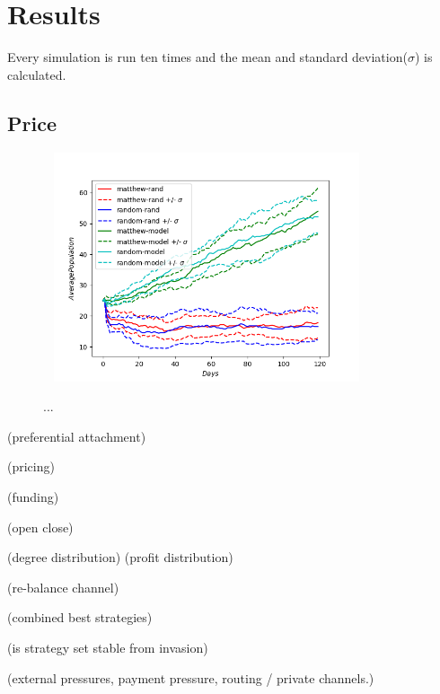 \chapter{Results}

Every simulation is run ten times and the mean and standard deviation($\sigma$) is calculated. 

\section{Price}

\begin{figure}[!htb]
	\hspace*{-1cm}\ 
	\centering
	\includegraphics[width=9cm]{images/histories_deviation.png}
	\caption{ ...
	}
	\label{fig:fee_curve}
	\hspace*{2mm} 
\end{figure}

(preferential attachment)

(pricing)

(funding)

(open close)

(degree distribution)
(profit distribution)

(re-balance channel)

(combined best strategies)

(is strategy set stable from invasion)

(external pressures, payment pressure, routing / private channels.)